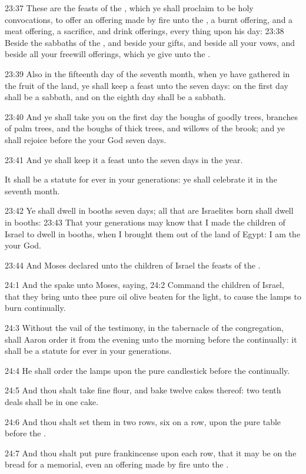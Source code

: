 23:37 These are the feasts of the \LORD, which ye shall proclaim to be holy convocations, to offer an offering made by fire unto the \LORD, a burnt offering, and a meat offering, a sacrifice, and drink offerings, every thing upon his day: 23:38 Beside the sabbaths of the \LORD, and beside your gifts, and beside all your vows, and beside all your freewill offerings, which ye give unto the \LORD.

23:39 Also in the fifteenth day of the seventh month, when ye have gathered in the fruit of the land, ye shall keep a feast unto the \LORD seven days: on the first day shall be a sabbath, and on the eighth day shall be a sabbath.

23:40 And ye shall take you on the first day the boughs of goodly trees, branches of palm trees, and the boughs of thick trees, and willows of the brook; and ye shall rejoice before the \LORD your God seven days.

23:41 And ye shall keep it a feast unto the \LORD seven days in the year.

It shall be a statute for ever in your generations: ye shall celebrate it in the seventh month.

23:42 Ye shall dwell in booths seven days; all that are Israelites born shall dwell in booths: 23:43 That your generations may know that I made the children of Israel to dwell in booths, when I brought them out of the land of Egypt: I am the \LORD your God.

23:44 And Moses declared unto the children of Israel the feasts of the \LORD.

24:1 And the \LORD spake unto Moses, saying, 24:2 Command the children of Israel, that they bring unto thee pure oil olive beaten for the light, to cause the lamps to burn continually.

24:3 Without the vail of the testimony, in the tabernacle of the congregation, shall Aaron order it from the evening unto the morning before the \LORD continually: it shall be a statute for ever in your generations.

24:4 He shall order the lamps upon the pure candlestick before the \LORD continually.

24:5 And thou shalt take fine flour, and bake twelve cakes thereof: two tenth deals shall be in one cake.

24:6 And thou shalt set them in two rows, six on a row, upon the pure table before the \LORD.

24:7 And thou shalt put pure frankincense upon each row, that it may be on the bread for a memorial, even an offering made by fire unto the \LORD.

